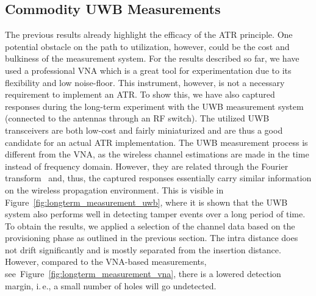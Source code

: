 \documentclass[conference]{IEEEtran}
\makeatletter
\newcommand{\ie}{i.\@\,e.\@\xspace}
\makeatother
\begin{document}
\subsection{Commodity UWB Measurements}
The previous results already highlight the efficacy of the ATR principle. One potential obstacle on the path to utilization, however, could be the cost and bulkiness of the measurement system. For the results described so far, we have used a professional VNA which is a great tool for experimentation due to its flexibility and low noise-floor. This instrument, however, is not a necessary requirement to implement an ATR. To show this, we have also captured responses during the long-term experiment with the UWB measurement system (connected to the antennas through an RF switch). The utilized UWB transceivers are both low-cost and fairly miniaturized and are thus a good candidate for an actual ATR implementation. The UWB measurement process is different from the VNA, as the wireless channel estimations are made in the time instead of frequency domain. However, they are related through the Fourier transform~\cite{goldsmith_wireless_2005} and, thus, the captured responses essentially carry similar information on the wireless propagation environment. This is visible in Figure~\ref{fig:longterm_measurement_uwb}, where it is shown that the UWB system also performs well in detecting tamper events over a long period of time. To obtain the results, we applied a selection of the channel data based on the provisioning phase as outlined in the previous section. The intra distance does not drift significantly and is mostly separated from the insertion distance. However, compared to the VNA-based measurements, see~Figure~\ref{fig:longterm_measurement_vna}, there is a lowered detection margin, \ie, a small number of holes will go undetected. 
\end{document}
